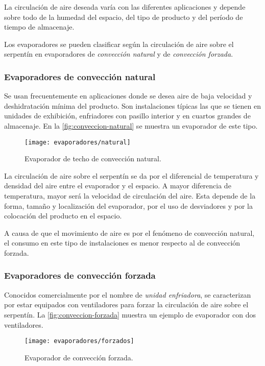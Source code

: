 	La circulación de aire deseada varía con las diferentes aplicaciones y depende sobre todo de la humedad del espacio, del tipo de producto y del período de tiempo de almacenaje. 
	
	Los evaporadores se pueden clasificar según la circulación de aire sobre el serpentín en evaporadores de \emph{convección natural} y de \emph{convección forzada}.
	
	\subsubsection{Evaporadores de convección natural}
	
	Se usan frecuentemente en aplicaciones donde se desea aire de baja velocidad y deshidratación mínima del producto. Son instalaciones típicas las que se tienen en unidades de exhibición, enfriadores con pasillo interior y en cuartos grandes de almacenaje. En la \autoref{fig:conveccion-natural} se muestra un evaporador de este tipo.
	
	
	\begin{figure}[h]
		\centering
		\texttt{[image: evaporadores/natural]}
		\caption{Evaporador de techo de convección natural.}\label{fig:conveccion-natural}
	\end{figure}
	
	La circulación de aire sobre el serpentín se da por el diferencial de temperatura y densidad del aire entre el evaporador y el espacio. A mayor diferencia de temperatura, mayor será la velocidad de circulación del aire. Esta depende de la forma, tamaño y localización del evaporador, por el uso de desviadores y por la colocación del producto en el espacio.
	
	A causa de que el movimiento de aire es por el fenómeno de convección natural, el consumo en este tipo de instalaciones es menor respecto al de convección forzada.
	
	\subsubsection{Evaporadores de convección forzada}
	
	Conocidos comercialmente por el nombre de \emph{unidad enfriadora}, se caracterizan por estar equipados con ventiladores para forzar la circulación de aire sobre el serpentín. La \autoref{fig:conveccion-forzada} muestra un ejemplo de evaporador con dos ventiladores.
	
	\begin{figure}[h]
		\centering
		\texttt{[image: evaporadores/forzados]}
		\caption{Evaporador de convección forzada.}\label{fig:conveccion-forzada}
	\end{figure}
	
